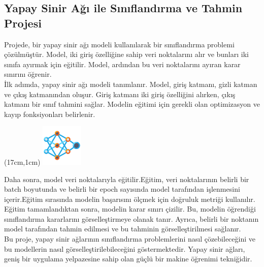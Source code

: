 \documentclass{article}
\begin{document}
\subsection{Yapay Sinir Ağı ile Sınıflandırma ve Tahmin Projesi}
Projede, bir yapay sinir ağı modeli kullanılarak bir sınıflandırma problemi çözülmüştür. Model, iki giriş özelliğine sahip veri noktalarını alır ve bunları iki sınıfa ayırmak için eğitilir. Model, ardından bu veri noktalarını ayıran karar sınırını öğrenir.\\[2pt]
İlk adımda, yapay sinir ağı modeli tanımlanır. Model, giriş katmanı, gizli katman ve çıkış katmanından oluşur. Giriş katmanı iki giriş özelliğini alırken, çıkış katmanı bir sınıf tahmini sağlar. Modelin eğitimi için gerekli olan optimizasyon ve kayıp fonksiyonları belirlenir.\\[2pt]
\newpage
\begin{textblock*}{5cm}(17cm,1cm) %
    \includegraphics[width=2cm]{image/sinir.png} %
\end{textblock*}
\noindent Daha sonra, model veri noktalarıyla eğitilir.Eğitim, veri noktalarının belirli bir batch boyutunda ve belirli bir epoch sayısında model tarafından işlenmesini içerir.Eğitim sırasında modelin başarısını ölçmek için doğruluk metriği kullanılır.\\[2pt]
Eğitim tamamlandıktan sonra, modelin karar sınırı çizilir. Bu, modelin öğrendiği sınıflandırma kararlarını görselleştirmeye olanak tanır. Ayrıca, belirli bir noktanın model tarafından tahmin edilmesi ve bu tahminin görselleştirilmesi sağlanır.\\[2pt]
Bu proje, yapay sinir ağlarının sınıflandırma problemlerini nasıl çözebileceğini ve bu modellerin nasıl görselleştirilebileceğini göstermektedir. Yapay sinir ağları, geniş bir uygulama yelpazesine sahip olan güçlü bir makine öğrenimi tekniğidir.
\end{document}
